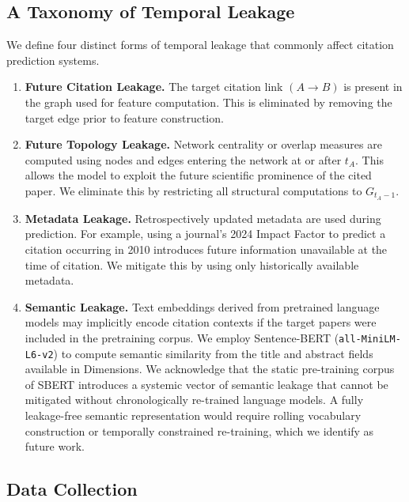 \documentclass[11pt,a4paper]{article}
\begin{document}
\subsection{A Taxonomy of Temporal Leakage}

We define four distinct forms of temporal leakage that commonly affect citation prediction systems.

\begin{enumerate}
    \item \textbf{Future Citation Leakage.}
    The target citation link \((A \to B)\) is present in the graph used for feature computation. This is eliminated by removing the target edge prior to feature construction.

    \item \textbf{Future Topology Leakage.}
    Network centrality or overlap measures are computed using nodes and edges entering the network at or after \(t_A\). This allows the model to exploit the future scientific prominence of the cited paper. We eliminate this by restricting all structural computations to \(G_{t_A-1}\).

    \item \textbf{Metadata Leakage.}
    Retrospectively updated metadata are used during prediction. For example, using a journal's 2024 Impact Factor to predict a citation occurring in 2010 introduces future information unavailable at the time of citation. We mitigate this by using only historically available metadata.

    \item \textbf{Semantic Leakage.}
    Text embeddings derived from pretrained language models may implicitly encode citation contexts if the target papers were included in the pretraining corpus. We employ Sentence-BERT (\texttt{all-MiniLM-L6-v2}) to compute semantic similarity from the title and abstract fields available in Dimensions. We acknowledge that the static pre-training corpus of SBERT introduces a systemic vector of semantic leakage that cannot be mitigated without chronologically re-trained language models. A fully leakage-free semantic representation would require rolling vocabulary construction or temporally constrained re-training, which we identify as future work.
\end{enumerate}

\subsection{Data Collection}
\end{document}
